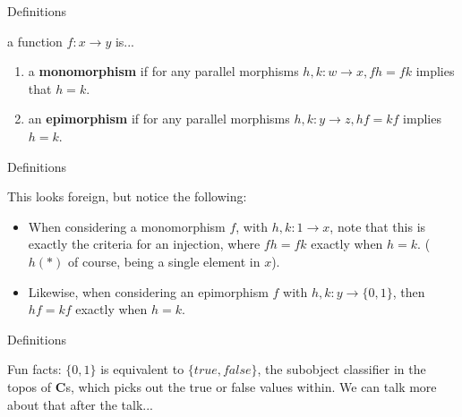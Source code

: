 \documentclass[tikz]{beamer}
\theoremstyle{definition}
\begin{document}
\begin{frame}{Definitions}
    \begin{definition}
        a function $f: x \to y$ is...
        \begin{enumerate}[i]
            \item a \textbf{monomorphism} if for any parallel morphisms $h,k: w \to x, fh = fk$ implies that $h = k$.
            
            \item an \textbf{epimorphism} if for any parallel morphisms $h,k: y \to z, hf = kf$ implies $h = k$.
        \end{enumerate}
    \end{definition}

\end{frame}{}
\begin{frame}{Definitions}

This looks foreign, but notice the following: 

\begin{itemize}
    \item When considering a monomorphism $f$, with $h, k: 1 \to x$, note that this is exactly the criteria for an injection, where $fh = fk$ exactly when $h = k$. ($h(*)$ of course, being a single element in $x$).
    
    \item Likewise, when considering an epimorphism $f$ with $h,k : y \to \{0,1\}$, then $hf = kf$ exactly when $h = k$.
\end{itemize}{}
    
\end{frame}{}

\begin{frame}{Definitions}
    
    Fun facts: $\{0,1\}$ is equivalent to $\{true, false\}$, the subobject classifier in the topos of $\mathbf{C}$s, which picks out the true or false values within. We can talk more about that after the talk...
\end{frame}
\end{document}
